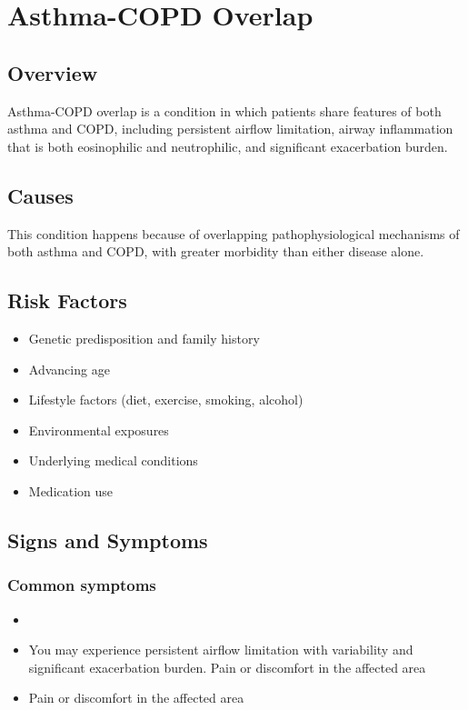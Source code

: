\chapter{Asthma-COPD Overlap}
\label{sec:Asthma-COPD Overlap}

\section{Overview}
Asthma-COPD overlap is a condition in which patients share features of both asthma and COPD, including persistent airflow limitation, airway inflammation that is both eosinophilic and neutrophilic, and significant exacerbation burden.
\section{Causes}
This condition happens because of overlapping pathophysiological mechanisms of both asthma and COPD, with greater morbidity than either disease alone.     
\section{Risk Factors}

\begin{itemize}[noitemsep]
  \item Genetic predisposition and family history
  \item Advancing age
  \item Lifestyle factors (diet, exercise, smoking, alcohol)
  \item Environmental exposures
  \item Underlying medical conditions
  \item Medication use
\end{itemize}
\section{Signs and Symptoms}

\subsection{Common symptoms}
\begin{itemize}[noitemsep]
  \item \item You may experience persistent airflow limitation with variability and significant exacerbation burden. Pain or discomfort in the affected area    \item Pain or discomfort in the affected area
  \end{itemize}

